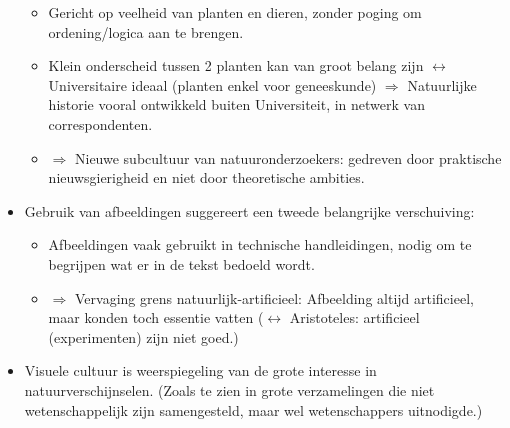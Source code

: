 \documentclass{article}
\begin{document}
\begin{itemize}
      \begin{itemize}
        \item Gericht op veelheid van planten en dieren, zonder poging om ordening/logica aan te brengen.
        \item Klein onderscheid tussen 2 planten kan van groot belang zijn $\leftrightarrow$ Universitaire ideaal (planten enkel voor geneeskunde) $\Rightarrow$ Natuurlijke historie vooral ontwikkeld buiten Universiteit, in netwerk van correspondenten.
        \item $\Rightarrow$ Nieuwe subcultuur van natuuronderzoekers: gedreven door praktische nieuwsgierigheid en niet door theoretische ambities.
      \end{itemize}
      \item Gebruik van afbeeldingen suggereert een tweede belangrijke verschuiving:
      \begin{itemize}
        \item Afbeeldingen vaak gebruikt in technische handleidingen, nodig om te begrijpen wat er in de tekst bedoeld wordt.
        \item $\Rightarrow$ Vervaging grens natuurlijk-artificieel: Afbeelding altijd artificieel, maar konden toch essentie vatten ($\leftrightarrow$ Aristoteles: artificieel (experimenten) zijn niet goed.)
      \end{itemize}
      \item Visuele cultuur is weerspiegeling van de grote interesse in natuurverschijnselen. (Zoals te zien in grote verzamelingen die niet wetenschappelijk zijn samengesteld, maar wel wetenschappers uitnodigde.)
    \end{itemize}

  \newpage
\end{document}
